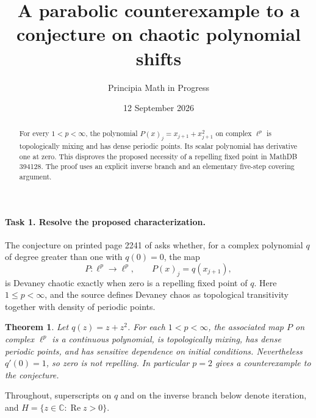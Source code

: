 \documentclass[11pt]{article}
\title{A parabolic counterexample to a conjecture on chaotic polynomial shifts}
\author{Principia Math in Progress}
\date{12 September 2026}
\newtheorem{theorem}{Theorem}
\newcommand{\C}{\mathbb C}
\newcommand{\Rea}{\operatorname{Re}}
\begin{document}
\maketitle
\begin{abstract}
For every \(1<p<\infty\), the polynomial
\(P(x)_j=x_{j+1}+x_{j+1}^2\) on complex \(\ell^p\) is topologically
mixing and has dense periodic points. Its scalar polynomial has derivative
one at zero. This disproves the proposed necessity of a repelling fixed
point in MathDB 394128. The proof uses an explicit inverse branch and an
elementary five-step covering argument.
\end{abstract}

\paragraph{Task 1. Resolve the proposed characterization.}
The conjecture on printed page 2241 of \cite{owr} asks whether, for a complex
polynomial \(q\) of degree greater than one with \(q(0)=0\), the map
\[
 P:\ell^p\longrightarrow\ell^p,\qquad
 P(x)_j=q(x_{j+1}),
\]
is Devaney chaotic exactly when zero is a repelling fixed point of \(q\).
Here \(1\le p<\infty\), and the source defines Devaney chaos as topological
transitivity together with density of periodic points.

\begin{theorem}\label{thm:main}
Let \(q(z)=z+z^2\). For each \(1<p<\infty\), the associated map \(P\)
on complex \(\ell^p\) is a continuous polynomial, is topologically mixing,
has dense periodic points, and has sensitive dependence on initial
conditions. Nevertheless \(q'(0)=1\), so zero is not repelling.
In particular \(p=2\) gives a counterexample to the conjecture.
\end{theorem}

Throughout, superscripts on \(q\) and on the inverse branch below denote
iteration, and \(H=\{z\in\C:\Rea z>0\}\).
\end{document}
